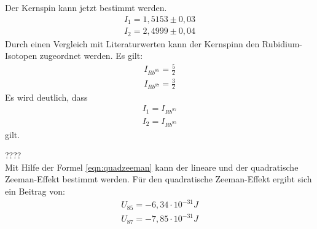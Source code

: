 Der Kernspin kann jetzt bestimmt werden.
\begin{align*}
  I_1=1,5153\pm0,03\\
  I_2=2,4999\pm0,04
\end{align*}
Durch einen Vergleich mit Literaturwerten \cite{spin} kann der Kernspinn den Rubidium-Isotopen zugeordnet werden.
Es gilt:
\begin{align*}
  I_{Rb^{85}}=\frac{5}{2}\\
  I_{Rb^{87}}=\frac{3}{2}
\end{align*}
Es wird deutlich, dass
\begin{align*}
  I_1=I_{Rb^{87}}\\
  I_2=I_{Rb^{85}}
\end{align*}
gilt.

????\\
Mit Hilfe der Formel \ref{eqn:quadzeeman} kann der lineare und der quadratische Zeeman-Effekt bestimmt werden.
Für den quadratische Zeeman-Effekt ergibt sich ein Beitrag von:
\begin{align*}
  U_{85}=-6,34\cdot 10^{-31}\si{J}\\
  U_{87}=-7,85\cdot 10^{-31}\si{J}
\end{align*}


%
